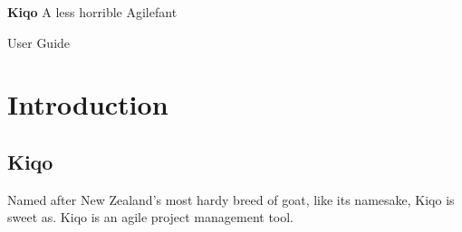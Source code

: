 \documentclass[11pt,fleqn]{book} %
\begin{document}

\begingroup
\thispagestyle{empty}
\centering
\vspace*{5cm}
\par\normalfont\fontsize{35}{35}\sffamily\selectfont
\textbf{Kiqo}
{\LARGE A less horrible Agilefant}\par %
\vspace*{1cm}
{\Huge User Guide}\par %
\endgroup


\tableofcontents %

\chapter{Introduction}

\section{Kiqo}
Named after New Zealand's most hardy breed of goat, like its namesake, Kiqo is sweet as. Kiqo is an agile project
management tool.
\end{document}
